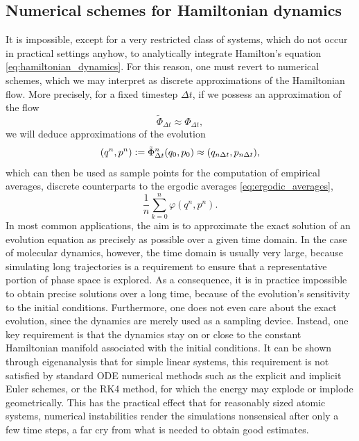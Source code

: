     \subsection{Numerical schemes for Hamiltonian dynamics}

    It is impossible, except for a very restricted class of systems, which do not occur in practical settings anyhow, to analytically integrate Hamilton's equation \eqref{eq:hamiltonian_dynamics}. For this reason, one must revert to numerical schemes, which we may interpret as discrete approximations of the Hamiltonian flow.
    More precisely, for a fixed timestep $\Delta t$, if we possess an approximation of the flow 
    \[\tilde\Phi_{\Delta t}\approx\Phi_{\Delta t},\]
    we will deduce approximations of the evolution
    \begin{equation}\label{eq:discrete_dynamics}(q^n,p^n)\mathrel{\mathop:}= \tilde\Phi_{\Delta t}^n(q_0,p_0)\approx (q_{n\Delta t},p_{n\Delta t}),\end{equation}
    which can then be used as sample points for the computation of empirical averages, discrete counterparts to the ergodic averages \eqref{eq:ergodic_averages},
    \begin{equation}
        \label{eq:discrete_ergodic_averages}
        \frac 1n\sum_{k=0}^n \varphi(q^n,p^n).
    \end{equation}
    In most common applications, the aim is to approximate the exact solution of an evolution equation as precisely as possible over a given time domain.
    In the case of molecular dynamics, however, the time domain is usually very large, because simulating long trajectories is a requirement to ensure that a representative portion of phase space is explored. As a consequence, it is in practice impossible to obtain precise solutions over a long time, because of the evolution's sensitivity to the initial conditions. 
    Furthermore, one does not even care about the exact evolution, since the dynamics are merely used as a sampling device. Instead, one key requirement is that the dynamics stay on or close to the constant Hamiltonian manifold associated with the initial conditions. It can be shown through eigenanalysis that for simple linear systems, this requirement is not satisfied by standard ODE numerical methods such as the explicit and implicit Euler schemes, or the RK4 method, for which the energy may explode or implode geometrically.
    This has the practical effect that for reasonably sized atomic systems, numerical instabilities render the simulations nonsensical after only a few time steps, a far cry from what is needed to obtain good estimates.

